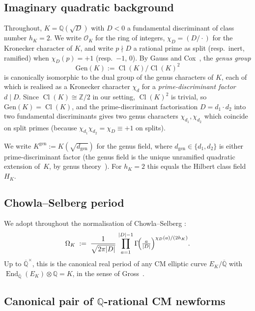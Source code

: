 \documentclass[11pt,a4paper]{amsart}
\theoremstyle{plain}
\theoremstyle{definition}
\DeclareMathOperator{\Cl}{Cl}
\DeclareMathOperator{\End}{End}
\newcommand{\Q}{\mathbb{Q}}
\newcommand{\Z}{\mathbb{Z}}
\newcommand{\OK}{\mathcal{O}_K}
\newcommand{\HK}{H_K}
\newcommand{\Kgen}{K^{\mathrm{gen}}}
\newcommand{\Qbar}{\overline{\Q}}
\newcommand{\absD}{\lvert D\rvert}
\newcommand{\eqdef}{:=}
\newcommand{\dgen}{d_{\mathrm{gen}}}
\begin{document}
\subsection{Imaginary quadratic background}\label{ss:setup-K}

Throughout, $K = \Q(\sqrt{D})$ with $D < 0$ a fundamental discriminant
of class number $h_K = 2$.  We write $\OK$ for the ring of integers,
$\chi_D = (D/\cdot)$ for the Kronecker character of $K$, and write
$p \nmid D$ a rational prime as split (resp.\ inert, ramified) when
$\chi_D(p) = +1$ (resp.\ $-1$, $0$).  By Gauss
\cite[\S 232--237]{Gauss1801} and Cox~\cite[Thm.~6.1]{Cox1989}, the
\emph{genus group}
\[
   \mathrm{Gen}(K) \eqdef \Cl(K) / \Cl(K)^2
\]
is canonically isomorphic to the dual group of the genus characters of
$K$, each of which is realised as a Kronecker character $\chi_d$ for a
\emph{prime-discriminant factor} $d \mid D$.  Since $\Cl(K) \cong \Z/2$
in our setting, $\Cl(K)^2$ is trivial, so $\mathrm{Gen}(K) = \Cl(K)$,
and the prime-discriminant factorisation $D = d_1 \cdot d_2$ into two
fundamental discriminants gives two genus characters $\chi_{d_1},
\chi_{d_2}$ which coincide on split primes
(because $\chi_{d_1} \chi_{d_2} = \chi_D \equiv +1$ on splits).

We write $\Kgen \eqdef K(\sqrt{\dgen})$ for the genus field, where
$\dgen \in \{d_1, d_2\}$ is either prime-discriminant factor (the
genus field is the unique unramified quadratic extension of~$K$, by
genus theory~\cite[\S 6.B]{Cox1989}).  For $h_K = 2$ this equals the
Hilbert class field~$\HK$.

\subsection{Chowla--Selberg period}\label{ss:setup-CS}

We adopt throughout the normalisation of Chowla--Selberg
\cite{ChowlaSelberg1949}:
\begin{equation}\label{eq:CS-period}
   \Omega_K \;\eqdef\; \frac{1}{\sqrt{2\pi\absD}}\,
     \prod_{a=1}^{\absD - 1}\Gamma\!\Bigl(\tfrac{a}{\absD}\Bigr)^{\chi_D(a)/(2 h_K)}.
\end{equation}
Up to $\Qbar^\times$, this is the canonical real period of any CM
elliptic curve $E_K/\Qbar$ with $\End_{\Qbar}(E_K) \otimes \Q = K$, in
the sense of Gross~\cite[Chap.~II]{Gross1980}.

\subsection{Canonical pair of $\Q$-rational CM newforms}\label{ss:setup-pair}
\end{document}
